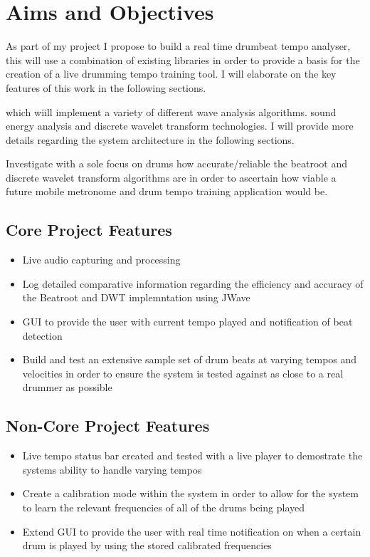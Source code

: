\documentclass[a4paper, 11pt]{article}
\begin{document}
\section{Aims and Objectives}

As part of my project I propose to build a real time drumbeat tempo analyser, this will use a combination of existing libraries in order to provide a basis for the creation of a live drumming tempo training tool. I will elaborate on the key features of this work in the following sections.

 which wiill implement a variety of different wave analysis algorithms. sound energy analysis and discrete wavelet transform technologies. I will provide more details regarding the system architecture in the following sections. 

Investigate with a sole focus on drums how accurate/reliable the beatroot and discrete wavelet transform algorithms are in order to ascertain how viable a future mobile metronome and drum tempo training application would be.



\subsection{Core Project Features}
\begin{itemize}
\item Live audio capturing and processing
\item Log detailed comparative information regarding the efficiency and accuracy of the Beatroot and DWT implemntation using JWave
\item GUI to provide the user with current tempo played and notification of beat detection
\item Build and test an extensive sample set of drum beats at varying tempos and velocities in order to ensure the system is tested against as close to a real drummer as possible
\end{itemize}

\subsection{Non-Core Project Features}
\begin{itemize}
\item Live tempo status bar created and tested with a live player to demostrate the systems ability to handle varying tempos
\item Create a calibration mode within the system in order to allow for the system to learn the relevant frequencies of all of the drums being played
\item Extend GUI to provide the user with real time notification on when a certain drum is played by using the stored calibrated frequencies
\end{itemize}
\end{document}
